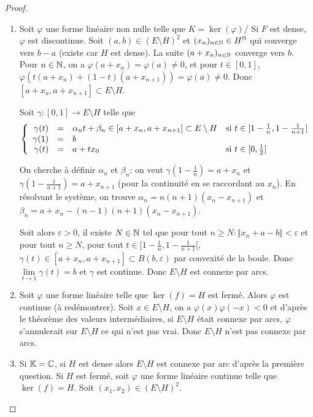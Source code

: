 \begin{proof}
	\phantom{}
	\begin{enumerate}
		\item Soit $\varphi$ une forme linéaire non nulle telle que $K=\ker(\varphi)$/ Si $F$ est dense, $\varphi$ est discontinue. Soit $(a,b)\in(E\setminus H)^{2}$ et $(x_{n})_{n\in\mathbb{N}}\in H^{\mathbb{N}}$ qui converge vers $b-a$ (existe car $H$ est dense). La suite $(a+x_{n})_{n\in\mathbb{N}}$ converge vers $b$. Pour $n\in\mathbb{N}$, on a $\varphi(a+x_{n})=\varphi(a)\neq0$, et pour $t\in[0,1]$, $\varphi(t(a+x_{n})+(1-t)(a+x_{n+1}))=\varphi(a)\neq0$. Donc $[a+x_{n},a+x_{n+1}]\subset E\setminus H$.
		
		Soit $\gamma:[0,1]\to E\setminus H$ telle que 
		\begin{equation}
		\left\{
			\begin{array}[]{rcll}
				\gamma(t) & = &\alpha_{n}t+\beta_{n}\in[a+x_{n},a+x_{n+1}]\subset E\setminus H &\text{si }t\in[1-\frac{1}{n},1-\frac{1}{n+1}]\\
				\gamma(1) & = &b&\\
				\gamma(t) &= & a+tx_{0}&\text{si }t\in[0,\frac{1}{2}]
			\end{array}
		\right.
		\end{equation}

		On cherche à définir $\alpha_{n}$ et $\beta_{n}$: on veut $\gamma(1-\frac{1}{n})=a+x_{n}$ et $\gamma(1-\frac{1}{n+1})=a+x_{n+1}$ (pour la continuité en se raccordant au $x_{n}$). En résolvant le système, on trouve $\alpha_{n}=n(n+1)(x_{n}-x_{n+1})$ et $\beta_{n}=a+x_{n}-(n-1)(n+1)(x_{n}-x_{n+1})$.

		Soit alors $\varepsilon>0$, il existe $N\in\mathbb{N}$ tel que pour tout $n\geqslant N\colon\Vert x_{n}+a-b\Vert<\varepsilon$ et pour tout $n\geqslant N$, pour tout $t\in[1-\frac{1}{n},1-\frac{1}{n+1}[$, $\gamma(t)\in[a+x_{n},a+x_{n+1}]\subset B(b,\varepsilon)$ par convexité de la boule. Donc $\lim\limits_{t\to 1}\gamma(t)=b$ et $\gamma$ est continue. Donc $E\setminus H$ est connexe par arcs.

		\item Soit $\varphi$ une forme linéaire telle que $\ker(f)=H$ est fermé. Alors $\varphi$ est continue (à redémontrer). Soit $x\in E\setminus H$, on a $\varphi(x)\varphi(-x)<0$ et d'après le théorème des valeurs intermédiaires, si $E\setminus H$ était connexe par arcs, $\varphi$ s'annulerait sur $E\setminus H$ ce qui n'est pas vrai. Donc $E\setminus H$ n'est pas connexe par arcs.
		
		\item Si $\mathbb{K}=\mathbb{C}$, si $H$ est dense alors $E\setminus H$ est connexe par arc d'après la première question. Si $H$ est fermé, soit $\varphi$ une forme linéaire continue telle que $\ker(f)=H$. Soit $(x_{1},x_{2})\in(E\setminus H)^{2}$. 
		

\end{enumerate}
\end{proof}
